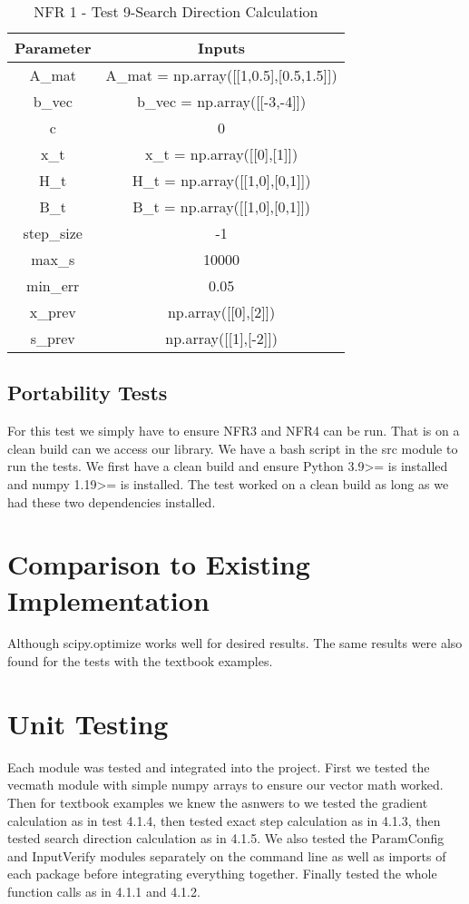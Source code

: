 \documentclass[12pt, titlepage]{article}
\begin{document}
\begin{table}[ht]
\caption{NFR 1 - Test 9-Search Direction Calculation} 

\label{tbl_NFR1T9}
\vspace*{2mm}
\centering
 \begin{tabular}{|c|c|} 
 \hline
\textbf{Parameter} & \textbf{Inputs} \\ 
\hline
A\_mat&  A\_mat = np.array([[1,0.5],[0.5,1.5]])   \\
 \hline
 b\_vec& b\_vec = np.array([[-3,-4]])  \\ 
 \hline
 c& 0  \\ 
 \hline
 x\_t& x\_t = np.array([[0],[1]]) \\ 
 \hline
 H\_t& H\_t = np.array([[1,0],[0,1]])\\ 
 \hline
 B\_t& B\_t = np.array([[1,0],[0,1]]) \\ 
 \hline
 step\_size& -1  \\ 
 \hline
 max\_s& 10000 \\ 
 \hline
 min\_err& 0.05  \\ 
 \hline
 x\_prev& np.array([[0],[2]])  \\ 
 \hline
 s\_prev& np.array([[1],[-2]])  \\ 
 \hline
 
 
\end{tabular}
\end{table}

\subsection{Portability Tests}

For this test we simply have to ensure NFR3 and NFR4 can be run. That is on a clean build can we access our library. We have a bash script in the src module to run the tests. We first have a clean build and ensure Python 3.9>= is installed and numpy 1.19>= is installed. The test worked on a clean build as long as we had these two dependencies installed. 
\section{Comparison to Existing Implementation}	

Although scipy.optimize works well for desired results. The same results were also found for the tests with the textbook examples.

\section{Unit Testing}
Each module was tested and integrated into the project. First we tested the vecmath module with simple numpy arrays to ensure our vector math worked. Then for textbook examples we knew the asnwers to we tested the gradient calculation as in test 4.1.4, then tested exact step calculation as in 4.1.3, then tested search direction calculation as in 4.1.5. We also tested the ParamConfig and InputVerify modules separately on the command line as well as imports of each package before integrating everything together. Finally tested the whole function calls as in 4.1.1 and 4.1.2.
\end{document}
